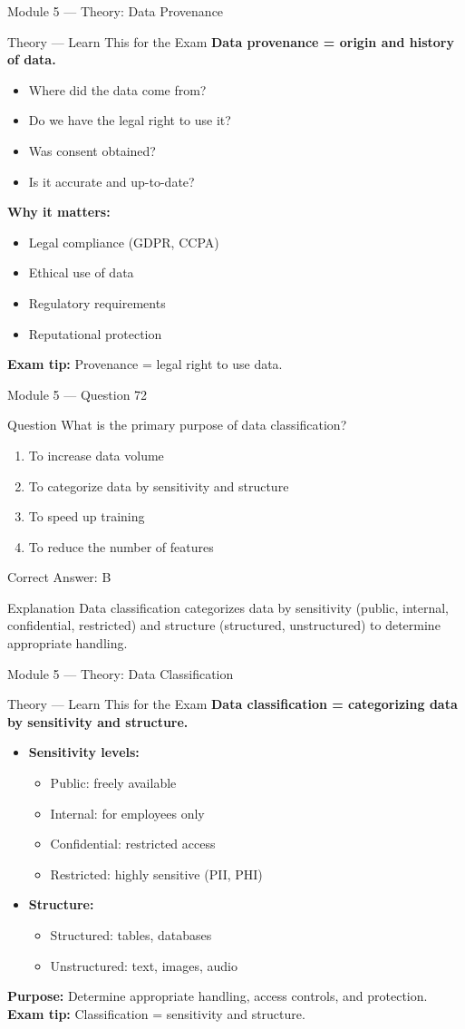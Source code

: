 \documentclass[aspectratio=169,10pt]{beamer}
\newcommand{\question}[1]{%
	\begin{block}{Question}
		#1
	\end{block}
}
\newcommand{\options}[4]{%
	\begin{enumerate}[label=\Alph*.,leftmargin=*]
		\item #1
		\item #2
		\item #3
		\item #4
	\end{enumerate}
}
\newcommand{\answerbox}[1]{%
	\begin{exampleblock}{Correct Answer: #1}
	\end{exampleblock}
}
\newcommand{\explain}[1]{%
	\begin{block}{Explanation}
		\small #1
	\end{block}
}
\newcommand{\theory}[1]{%
	\begin{block}{Theory --- Learn This for the Exam}
		\small #1
	\end{block}
}
\begin{document}
	\begin{frame}{Module 5 --- Theory: Data Provenance}
		\theory{
			\textbf{Data provenance = origin and history of data.}
			\begin{itemize}
				\item Where did the data come from?
				\item Do we have the legal right to use it?
				\item Was consent obtained?
				\item Is it accurate and up-to-date?
			\end{itemize}
			\textbf{Why it matters:}
			\begin{itemize}
				\item Legal compliance (GDPR, CCPA)
				\item Ethical use of data
				\item Regulatory requirements
				\item Reputational protection
			\end{itemize}
			\textbf{Exam tip:} Provenance = legal right to use data.
		}
	\end{frame}
	
	\begin{frame}{Module 5 --- Question 72}
		\question{What is the primary purpose of data classification?}
		\options{To increase data volume}{To categorize data by sensitivity and structure}{To speed up training}{To reduce the number of features}
		\answerbox{B}
		\explain{Data classification categorizes data by sensitivity (public, internal, confidential, restricted) and structure (structured, unstructured) to determine appropriate handling.}
	\end{frame}
	
	\begin{frame}{Module 5 --- Theory: Data Classification}
		\theory{
			\textbf{Data classification = categorizing data by sensitivity and structure.}
			\begin{itemize}
				\item \textbf{Sensitivity levels:}
				\begin{itemize}
					\item Public: freely available
					\item Internal: for employees only
					\item Confidential: restricted access
					\item Restricted: highly sensitive (PII, PHI)
				\end{itemize}
				\item \textbf{Structure:}
				\begin{itemize}
					\item Structured: tables, databases
					\item Unstructured: text, images, audio
				\end{itemize}
			\end{itemize}
			\textbf{Purpose:} Determine appropriate handling, access controls, and protection.
			\textbf{Exam tip:} Classification = sensitivity and structure.
		}
	\end{frame}
	
\end{document}

